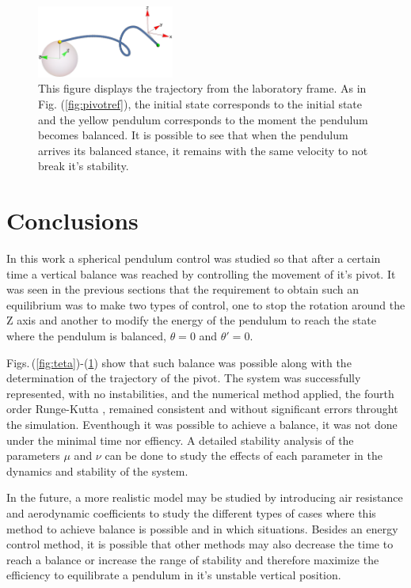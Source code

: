 \documentclass[prd,twocolumn,nofootinbib,showpacs]{revtex4-1}
\begin{document}
\begin{figure}[H]
    \centering
    \includegraphics[width=0.4\textwidth]{Estabilizacaotraj1.png}
    \caption{This figure displays the trajectory from the laboratory frame. As in Fig. (\ref{fig:pivotref}), the initial state corresponds to the initial state and the yellow pendulum corresponds to the moment the pendulum becomes balanced. It is possible to see that when the pendulum arrives its balanced stance, it remains with the same velocity to not break it's stability.}
    \label{fig:labref}
\end{figure}
\section{Conclusions}

In this work a spherical pendulum control was studied so that after a certain time a vertical balance was reached by  controlling the movement of it's pivot. It was seen in the previous sections that the requirement to obtain such an equilibrium was to make two types of control, one to stop the rotation around the Z axis and another to modify the energy of the pendulum to reach the state where the pendulum is balanced, $\theta=0$ and $\theta'=0$.
\par Figs.$\,$(\ref{fig:teta})-(\ref{fig:labref}) show that such balance was possible along with the determination of the trajectory of the pivot. The system was successfully represented, with no instabilities, and the numerical method applied, the fourth order Runge-Kutta \cite{Rungekutta}, remained consistent and without significant errors throught the simulation.
Eventhough it was possible to achieve a balance, it was not done under the minimal time nor effiency. A detailed stability analysis of the parameters $\mu$ and $\nu$ can be done to study the effects of each parameter in the dynamics and stability of the system. 
\par In the future, a more realistic model may be studied by introducing air resistance and aerodynamic coefficients to study the different types of cases where this method to achieve balance is possible and in which situations. 
Besides an energy control method, it is possible that other methods may also decrease the time to reach a balance or increase the range of stability and therefore maximize the efficiency to equilibrate a pendulum in it's unstable vertical position.
\end{document}
